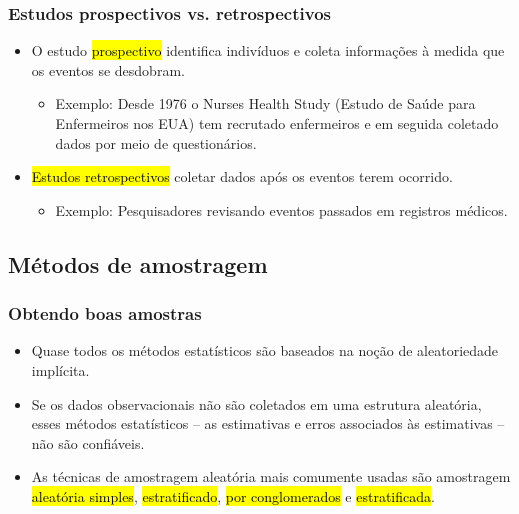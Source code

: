 
\begin{frame}
\frametitle{Estudos prospectivos vs. retrospectivos}

\begin{itemize}
\justifying
\item O estudo \hl{prospectivo} identifica indivíduos e coleta informações à medida que os eventos se desdobram.
\begin{itemize}
\justifying
\item Exemplo: Desde 1976 o Nurses Health Study (Estudo de Saúde para Enfermeiros nos EUA) tem recrutado enfermeiros e em seguida coletado dados por meio de questionários.
\end{itemize}
\justifying
\item \hl{Estudos retrospectivos} coletar dados após os eventos terem ocorrido.
\begin{itemize}
\justifying
\item Exemplo: Pesquisadores revisando eventos passados em registros médicos.
\end{itemize}

\end{itemize}

\end{frame}


\subsection{Métodos de amostragem}


\begin{frame}
\frametitle{Obtendo boas amostras}

\begin{itemize}
\justifying
\item Quase todos os métodos estatísticos são baseados na noção de aleatoriedade implícita.
\justifying
\item Se os dados observacionais não são coletados em uma estrutura aleatória, esses métodos estatísticos -- as estimativas e erros associados às estimativas -- não são confiáveis.
\justifying
\item As técnicas de amostragem aleatória mais comumente usadas são amostragem \hl{aleatória simples}, \hl{estratificado}, \hl{por conglomerados} e \hl{estratificada}.

\end{itemize}

\end{frame}

